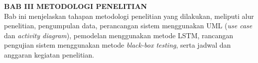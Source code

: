 \noindent\textbf{BAB III METODOLOGI PENELITIAN}\\
Bab ini menjelaskan tahapan metodologi penelitian yang dilakukan, meliputi alur penelitian, pengumpulan data, perancangan sistem menggunakan UML (\textit{use case} dan \textit{activity diagram}), pemodelan menggunakan metode LSTM, rancangan pengujian sistem menggunakan metode \textit{black-box testing}, serta jadwal dan anggaran kegiatan penelitian.